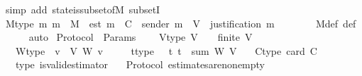 \begin{isabellebody}
\isatagproof
{}\isamarkupfalse%
\ {\isacharparenleft}simp\ add{\isacharcolon}\ state{\isacharunderscore}is{\isacharunderscore}subset{\isacharunderscore}of{\isacharunderscore}M\ subsetI{\isacharparenright}%
\endisatagproof
{\isafoldproof}%
%
\isadelimproof
\isanewline
%
\endisadelimproof
\isanewline
\ \ \isamarkupfalse%
\ M{\isacharunderscore}type{\isacharcolon}\ {\isachardoublequoteopen}{\isasymAnd}m{\isachardot}\ m\ {\isasymin}\ M\ {\isasymLongrightarrow}\ est\ m\ {\isasymin}\ C\ {\isasymand}\ sender\ m\ {\isasymin}\ V\ {\isasymand}\ justification\ m\ {\isasymin}\ {\isasymSigma}{\isachardoublequoteclose}\isanewline
%
\isadelimproof
\ \ \ \ %
\endisadelimproof
%
\isatagproof
{}\isamarkupfalse%
\ M{\isacharunderscore}def\ {\isasymSigma}{\isacharunderscore}def\isanewline
\ \ \ \ \isamarkupfalse%
\ auto%
\endisatagproof
{\isafoldproof}%
%
\isadelimproof
\isanewline
%
\endisadelimproof
\isanewline
{}\isamarkupfalse%
\isanewline
\isanewline
\isanewline
{}\isamarkupfalse%
\ Protocol\ {\isacharequal}\ Params\ {\isacharplus}\isanewline
\ \ \ V{\isacharunderscore}type{\isacharcolon}\ {\isachardoublequoteopen}V\ {\isasymnoteq}\ {\isasymemptyset}\ {\isasymand}\ finite\ V{\isachardoublequoteclose}\isanewline
\ \ \ W{\isacharunderscore}type{\isacharcolon}\ {\isachardoublequoteopen}{\isasymforall}\ v\ {\isasymin}\ V{\isachardot}\ W\ v\ {\isachargreater}\ {}{\isachardoublequoteclose}\isanewline
\ \ \ t{\isacharunderscore}type{\isacharcolon}\ {\isachardoublequoteopen}{}\ {\isasymle}\ t{\isachardoublequoteclose}\ {\isachardoublequoteopen}t\ {\isacharless}\ sum\ W\ V{\isachardoublequoteclose}\isanewline
\ \ \ C{\isacharunderscore}type{\isacharcolon}\ {\isachardoublequoteopen}card\ C\ {\isachargreater}\ {}{\isachardoublequoteclose}\isanewline
\ \ \ {\isasymepsilon}{\isacharunderscore}type{\isacharcolon}\ {\isachardoublequoteopen}is{\isacharunderscore}valid{\isacharunderscore}estimator\ {\isasymepsilon}{\isachardoublequoteclose}\isanewline
\isanewline
{}\isamarkupfalse%
\ {\isacharparenleft}\ Protocol{\isacharparenright}\ estimates{\isacharunderscore}are{\isacharunderscore}non{\isacharunderscore}empty{\isacharcolon}\ {\isachardoublequoteopen}{\isasymAnd}\ {\isasymsigma}{\isachardot}\ {\isasymsigma}\ {\isasymin}\ {\isasymSigma}\ {\isasymLongrightarrow}\ {\isasymepsilon}\ {\isasymsigma}\ {\isasymnoteq}\ {\isasymemptyset}{\isachardoublequoteclose}\isanewline

\end{isabellebody}
